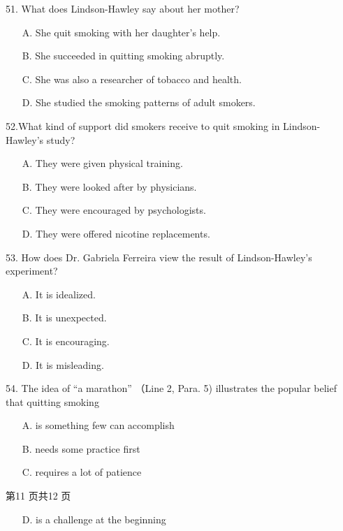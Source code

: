 \documentclass[UTF8,11pt]{ctexart}
\begin{document}
51. What does Lindson-Hawley say about her mother?


\begin{itemize}[leftmargin=2em,itemsep=.2em,topsep=.4em]\item[A.] She quit smoking with her daughter’s help.
\item[B.] She succeeded in quitting smoking abruptly.
\item[C.] She was also a researcher of tobacco and health.
\item[D.] She studied the smoking patterns of adult smokers.
\end{itemize}

52.What kind of support did smokers receive to quit smoking in Lindson-Hawley’s study?


\begin{itemize}[leftmargin=2em,itemsep=.2em,topsep=.4em]\item[A.] They were given physical training.
\item[B.] They were looked after by physicians.
\item[C.] They were encouraged by psychologists.
\item[D.] They were offered nicotine replacements.
\end{itemize}

53. How does Dr. Gabriela Ferreira view the result of Lindson-Hawley’s experiment?


\begin{itemize}[leftmargin=2em,itemsep=.2em,topsep=.4em]\item[A.] It is idealized.
\item[B.] It is unexpected.
\item[C.] It is encouraging.
\item[D.] It is misleading.
\end{itemize}

54. The idea of “a marathon” （Line 2, Para. 5) illustrates the popular belief that quitting smoking


\begin{itemize}[leftmargin=2em,itemsep=.2em,topsep=.4em]\item[A.] is something few can accomplish
\item[B.] needs some practice first
\item[C.] requires a lot of patience
\end{itemize}

第11 页共12 页


\begin{itemize}[leftmargin=2em,itemsep=.2em,topsep=.4em]\item[D.] is a challenge at the beginning
\end{itemize}
\end{document}

